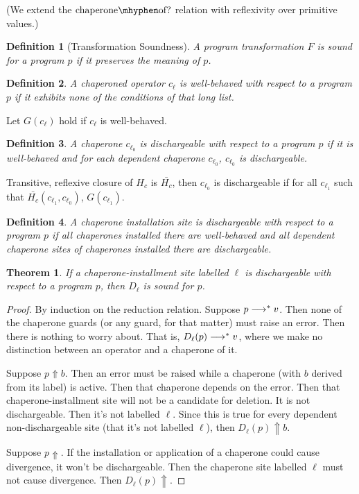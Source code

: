 \documentclass{sigplanconf}
\newtheorem{definition}{Definition}
\newtheorem{theorem}{Theorem}
\begin{document}
(We extend the $\mathrm{chaperone\mhyphen of?}$ relation with reflexivity over primitive values.)

\begin{definition}[Transformation Soundness]
A program transformation $F$ is sound for a program $p$ if it preserves the meaning of $p$.
\end{definition}

\begin{definition}
A chaperoned operator $c_\ell$ is \emph{well-behaved} with respect to a program $p$ if it exhibits none of the conditions of that long list.
\end{definition}

Let $G(c_\ell)$ hold if $c_\ell$ is well-behaved.

\begin{definition}
A chaperone $c_{\ell_0}$ is \emph{dischargeable} with respect to a program $p$ if it is well-behaved and for each dependent chaperone $c_{\ell_0}$, $c_{\ell_0}$ is dischargeable.
\end{definition}

Transitive, reflexive closure of $H_c$ is $\bar{H_c}$,
then $c_{\ell_0}$ is dischargeable if for all $c_{\ell_1}$ such that $\bar{H_c}(c_{\ell_1},c_{\ell_0})$, $G(c_{\ell_1})$.

\begin{definition}
A chaperone installation site is \emph{dischargeable} with respect to a program $p$ if all chaperones installed there are well-behaved and all dependent chaperone sites of chaperones installed there are dischargeable.
\end{definition}

\begin{theorem}
If a chaperone-installment site labelled $\ell$ is dischargeable with respect to a program $p$, then $D_\ell$ is sound for $p$.
\end{theorem}

\begin{proof}
By induction on the reduction relation.
Suppose $p\longrightarrow^{*} v$.
Then none of the chaperone guards (or any guard, for that matter) must raise an error.
Then there is nothing to worry about.
That is, $D_\ell(p)\longrightarrow^{*} v$, where we make no distinction between an operator and a chaperone of it.

Suppose $p\Uparrow b$. 
Then an error must be raised while a chaperone (with $b$ derived from its label) is active.
Then that chaperone depends on the error.
Then that chaperone-installment site will not be a candidate for deletion.
It is not dischargeable.
Then it's not labelled $\ell$.
Since this is true for every dependent non-dischargeable site (that it's not labelled $\ell$), then $D_\ell(p)\Uparrow b$.

Suppose $p\Uparrow$.
If the installation or application of a chaperone could cause divergence, it won't be dischargeable.
Then the chaperone site labelled $\ell$ must not cause divergence.
Then $D_\ell(p)\Uparrow$.
\end{proof}
\end{document}
